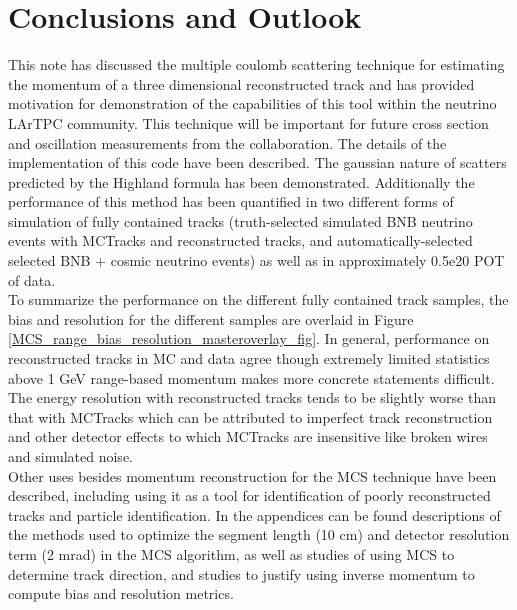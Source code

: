 \section{Conclusions and Outlook}\label{conclusion_section}

This note has discussed the multiple coulomb scattering technique for estimating the momentum of a three dimensional reconstructed track and has provided motivation for demonstration of the capabilities of this tool within the neutrino LArTPC community. This technique will be important for future cross section and oscillation measurements from the {\ub} collaboration. The details of the implementation of this code have been described. The gaussian nature of scatters predicted by the Highland formula has been demonstrated. Additionally the performance of this method has been quantified in two different forms of simulation of fully contained tracks (truth-selected simulated BNB neutrino events with {\sc MCTracks} and reconstructed tracks, and automatically-selected selected BNB + cosmic neutrino events) as well as in approximately 0.5e20 POT of {\ub} data.\\

To summarize the performance on the different fully contained track samples, the bias and resolution for the different samples are overlaid in Figure \ref{MCS_range_bias_resolution_masteroverlay_fig}. In general, performance on reconstructed tracks in MC and data agree though extremely limited statistics above 1 GeV range-based momentum makes more concrete statements difficult. The energy resolution with reconstructed tracks tends to be slightly worse than that with {\sc MCTracks} which can be attributed to imperfect track reconstruction and other detector effects to which {\sc MCTracks} are insensitive like broken wires and simulated noise.\\

Other uses besides momentum reconstruction for the MCS technique have been described, including using it as a tool for identification of poorly reconstructed tracks and particle identification. In the appendices can be found descriptions of the methods used to optimize the segment length (10 cm) and detector resolution term (2 mrad) in the MCS algorithm, as well as studies of using MCS to determine track direction, and studies to justify using inverse momentum to compute bias and resolution metrics.\\

